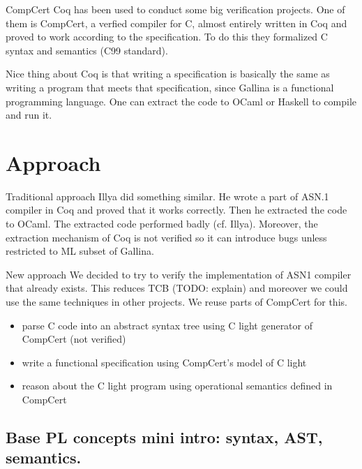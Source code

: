 \documentclass{beamer}
\begin{document}
  \begin{frame}{CompCert}
    Coq has been used to conduct some big verification projects. One of them is CompCert, a verfied compiler for C, almost entirely written in Coq and proved to work according to the specification.
        \bigskip
 To do this they formalized C syntax and semantics (C99 standard).

    \bigskip
    
    Nice thing about Coq is that writing a specification is basically the same as writing a program that meets that specification, since Gallina is a functional programming language. One can extract the code to OCaml or Haskell to compile and run it.

    
    
\end{frame}


\section{Approach}

\begin{frame}{Traditional approach}
  Illya did something similar. He wrote a part of ASN.1 compiler in Coq and proved that it works correctly. Then he extracted the code to OCaml. The extracted code performed badly (cf. Illya). Moreover, the extraction mechanism of Coq is not verified so it can introduce bugs unless restricted to ML subset of Gallina.
\end{frame}

\begin{frame}{New approach}
  We decided to try to verify the implementation of ASN1 compiler that already exists. This reduces TCB (TODO: explain) and moreover we could use the same techniques in other projects. We reuse parts of CompCert for this.
\begin{itemize}
\item parse C code into an abstract syntax tree using C light generator of CompCert (not verified)
  \item write a functional specification using CompCert's model of C light 
\item reason about the C light program using operational semantics defined in CompCert
\end{itemize}
\end{frame}
\subsection{Base PL concepts mini intro: syntax, AST, semantics.}
\end{document}
